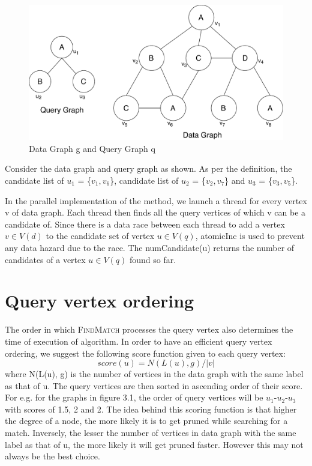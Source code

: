 \begin{figure}[h!]
\begin{center}
        \centering
        \includegraphics[width=\textwidth]{images/Implementation.pdf}
        \caption{Data Graph g and Query Graph q}
        \label{fig:flowchart}
\end{center}
\end{figure}

Consider the data graph and query graph as shown. As per the definition, the candidate list of $u_1$ = \{$v_1, v_6$\}, candidate list of $u_2$ = \{$v_2, v_7$\} and $u_3$ = \{$v_3, v_5$\}.

In the parallel implementation of the method, we launch a thread for every vertex v of data graph. Each thread then finds all the query vertices of which v can be a candidate of. Since there is a data race between each thread to add a vertex $v \in V(d)$ to the candidate set of vertex $u \in V(q)$, atomicInc is used to prevent any data hazard due to the race. The numCandidate(u) returns the number of candidates of a vertex $u \in V(q)$ found so far.

\section{Query vertex ordering}

The order in which \textsc{FindMatch} processes the query vertex also determines the time of execution of algorithm. In order to have an efficient query vertex ordering, we suggest the following score function given to each query vertex:
\[
score(u) = N(L(u), g)/|v|
\]
where N(L(u), g) is the number of vertices in the data graph with the same label as that of u. The query vertices are then sorted in ascending order of their score. For e.g. for the graphs in figure 3.1, the order of query vertices will be $u_1$-$u_2$-$u_3$ with scores of 1.5, 2 and 2. The idea behind this scoring function is that higher the degree of a node, the more likely it is to get pruned while searching for a match. Inversely, the lesser the number of vertices in data graph with the same label as that of u, the more likely it will get pruned faster. However this may not always be the best choice.


